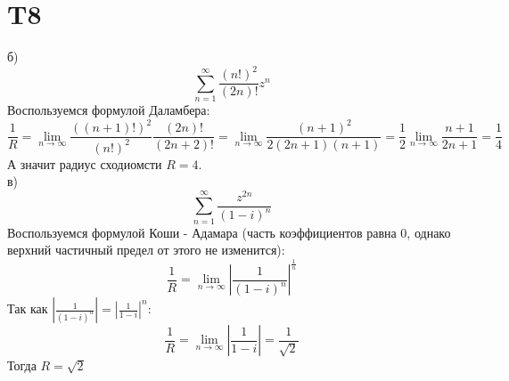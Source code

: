 \documentclass[12pt]{article}
\begin{document}
\section{T8}
б)
\[
    \sum_{n=1}^{\infty} \frac{(n!)^2}{(2n)!} z^n 
\]
Воспользуемся формулой Даламбера:
\[
    \frac{1}{R} = \lim_{n \to \infty} \frac{\left( (n+1)! \right)^2 }{(n!)^2} \frac{(2n)!}{(2n + 2)!} = 
    \lim_{n \to \infty} \frac{(n + 1)^2}{2(2n + 1)(n+1)} = \frac{1}{2} \lim_{n \to \infty} \frac{n+1}{2n+1} = \frac{1}{4} 
\]
А значит радиус сходиомсти $R = 4$. 
\\ в)
\[
    \sum_{n=1}^{\infty} \frac{z^{2n}}{(1 - i)^n}
\]
Воспользуемся формулой Коши - Адамара (часть коэффициентов равна 0, однако верхний частичный предел от этого не изменится):
\[
    \frac{1}{R} = \lim_{n \to \infty} \left\vert \frac{1}{(1 - i)^n} \right\vert^{\frac{1}{n}} 
\]
Так как $\left\vert \frac{1}{(1 - i)^n} \right\vert = \left\vert \frac{1}{1 - i} \right\vert^n$: 
\[
    \frac{1}{R} = \lim_{n \to \infty} \left\vert \frac{1}{1 - i} \right\vert = \frac{1}{\sqrt{2}}
\]
Тогда $R = \sqrt{2}$
\end{document}
